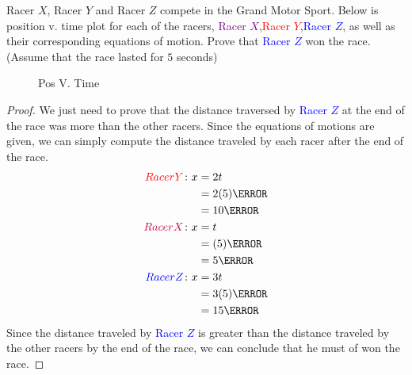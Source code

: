 \documentclass[12pt]{article} %
\begin{document}
\begin{qstn}[4]
    Racer $X$, Racer $Y$ and Racer $Z$ compete in the Grand Motor Sport. Below is position v. time plot for each of the racers, \textcolor{purple}{Racer $X$},\textcolor{red}{Racer $Y$},\textcolor{blue}{Racer $Z$}, as well as their corresponding equations of motion. Prove that \textcolor{blue}{Racer $Z$} won the race. (Assume that the race lasted for $5$ seconds)
    \begin{figure}[h]
        \centering
        \caption{Pos V. Time}
        \label{fig:my-awesome-graph}
    \end{figure}

    \begin{soln}
        \begin{proof}
            We just need to prove that the distance traversed by \textcolor{blue}{Racer $Z$} at the end of the race was more than the other racers. Since the equations of motions are given, we can simply compute the distance traveled by each racer after the end of the race. 
            \begin{align*}
                \textcolor{red}{Racer Y} \colon x &= 2t \\
                &= 2(5) \m\\
                &= 10\m\\
                \textcolor{purple}{Racer X} \colon x &= t \\
                &= (5) \m \\
                &= 5\m \\
                \textcolor{blue}{Racer Z} \colon x &= 3t\\
                &= 3(5) \m \\
                &= 15 \m
            \end{align*}
            Since the distance traveled by \textcolor{blue}{Racer $Z$} is greater than the distance traveled by the other racers by the end of the race, we can conclude that he must of won the race.
        \end{proof}



\end{soln}
\end{qstn}
\end{document}
